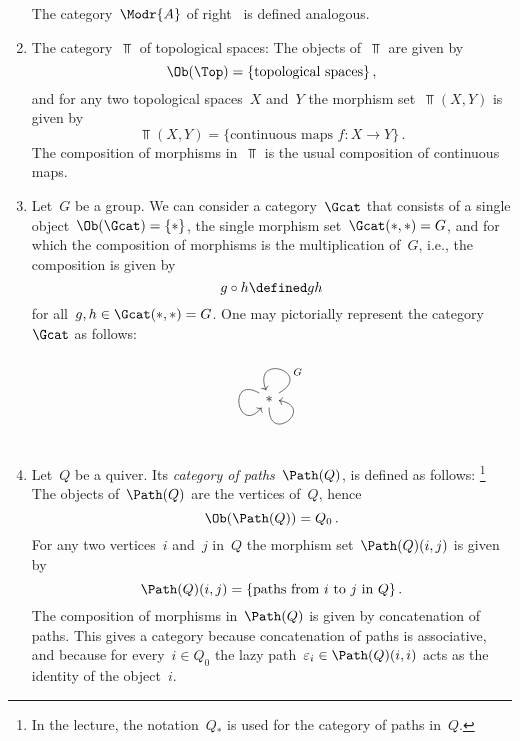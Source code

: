 \begin{example}
\begin{enumerate}
      The category~$\Modr{A}$ of right~{} is defined analogous.
    \item
      The category~$\Top$ of topological spaces:
      The objects of~$\Top$ are given by
      \[
          \Ob(\Top)
        = \{
            \text{topological spaces}
          \} \,,
      \]
      and for any two topological spaces~$X$ and~$Y$ the morphism set~$\Top(X,Y)$ is given by
      \[
          \Top(X,Y)
        = \{
            \text{continuous maps~$f \colon X \to Y$}
          \} \,.
      \]
      The composition of morphisms in~$\Top$ is the usual composition of continuous maps.
    \item
      Let~$G$ be a group.
      We can consider a category~$\Gcat$ that consists of a single object~$\Ob(\Gcat) = \{ \ast \}$, the single morphism set~$\Gcat(\ast,\ast) = G$, and for which the composition of morphisms is the multiplication of~$G$, i.e., the composition is given by
      \[
                  g \circ h
        \defined  gh
      \]
      for all~$g, h \in \Gcat(\ast,\ast) = G$.
      One may pictorially represent the category~$\Gcat$ as follows:
      \[
        \begin{tikzcd}
          \ast
          \arrow[out=30,in=110,loop]{}[above right, near start]{G}
          \arrow[out=150,in=230,loop,looseness=6.5]
          \arrow[out=270,in=350,loop]
        \end{tikzcd}
      \]
    \item
      Let~$Q$ be a quiver.
      Its \emph{category of paths}~$\Path(Q)$, is defined as follows:%
      \footnote{In the lecture, the notation~$Q_*$ is used for the category of paths in~$Q$.}
      The objects of~$\Path(Q)$ are the vertices of~$Q$, hence
      \[
          \Ob(\Path(Q))
        = Q_0 \,.
      \]
      For any two vertices~$i$ and~$j$ in~$Q$ the morphism set~$\Path(Q)(i,j)$ is given by
      \[
          \Path(Q)(i,j)
        = \{
            \text{paths from~$i$ to~$j$ in~$Q$}
          \} \,.
      \]
      The composition of morphisms in~$\Path(Q)$ is given by concatenation of paths.
      This gives a category because concatenation of paths is associative, and because for every~$i \in Q_0$ the lazy path~$\varepsilon_i \in \Path(Q)(i,i)$ acts as the identity of the object~$i$.
  \end{enumerate}
\end{example}


